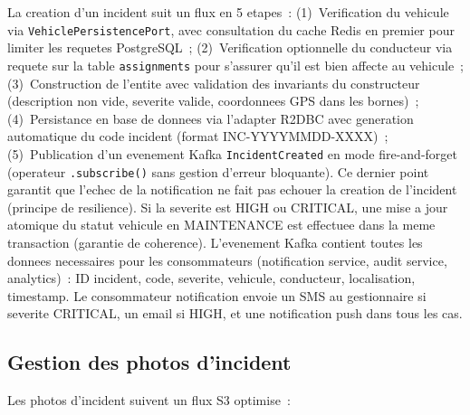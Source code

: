 \documentclass[12pt,a4paper]{report}
\begin{document}
\begin{lecture}
La creation d'un incident suit un flux en 5 etapes~:
(1)~Verification du vehicule via \texttt{VehiclePersistencePort}, avec
consultation du cache Redis en premier pour limiter les requetes PostgreSQL~;
(2)~Verification optionnelle du conducteur via requete sur la table
\texttt{assignments} pour s'assurer qu'il est bien affecte au vehicule~;
(3)~Construction de l'entite avec validation des invariants du constructeur
(description non vide, severite valide, coordonnees GPS dans les bornes)~;
(4)~Persistance en base de donnees via l'adapter R2DBC avec generation
automatique du code incident (format INC-YYYYMMDD-XXXX)~;
(5)~Publication d'un evenement Kafka \texttt{IncidentCreated} en mode
fire-and-forget (operateur \texttt{.subscribe()} sans gestion d'erreur
bloquante). Ce dernier point garantit que l'echec de la notification
ne fait pas echouer la creation de l'incident (principe de resilience).
Si la severite est HIGH ou CRITICAL, une mise a jour atomique du statut
vehicule en MAINTENANCE est effectuee dans la meme transaction (garantie
de coherence). L'evenement Kafka contient toutes les donnees necessaires
pour les consommateurs (notification service, audit service, analytics)~:
ID incident, code, severite, vehicule, conducteur, localisation, timestamp.
Le consommateur notification envoie un SMS au gestionnaire si severite
CRITICAL, un email si HIGH, et une notification push dans tous les cas.
\end{lecture}

\subsection{Gestion des photos d'incident}

Les photos d'incident suivent un flux S3 optimise~:
\end{document}
